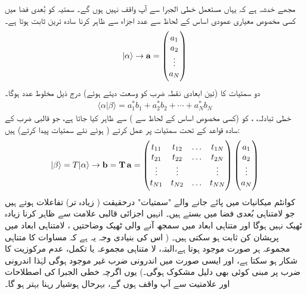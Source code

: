  مجھے خدشہ ہے کہ یہاں مستعمل خطی الجبرا سے آپ واقف نہیں ہوں گے۔ سمتیہ کو  بُعدی فضا میں کسی مخصوص معیاری عمودی اساس کے لحاظ سے  عدد اجزاء 
 سے ظاہر کرنا سادہ ترین ثابت ہوتا ہے۔
	\begin{align}
		|\alpha \rangle \rightarrow \operatorname{\mathbf{a}} = \begin{pmatrix} 
			a_{1}\\
			a_{2}\\
			\vdots\\
			a_{N}
		 \end{pmatrix}
	\end{align}
 دو سمتیات کا 
  (تین ابعادی نقطہ ضرب کو وسعت دیتے ہوئے) درج ذیل مخلوط عدد ہوگا۔
\begin{align}\label{مساوات_قواعد_اندرونی_ضرب}
	\langle \alpha | \beta\rangle =a_1^{\ast}b_1 + a_2^{\ast}b_2 + \dotsb +a_N^{\ast}b_N
\end{align}
خطی تبادلہ، ، کو (کسی مخصوص اساس کے لحاظ سے )  سے ظاہر کیا جاتا ہے، جو قالبی ضرب کے سادہ قواعد کے تحت سمتیات پر عمل کرتے ( ہوئے نئے سمتیات پیدا کرتے) ہیں:
\begin{align}
	|\beta\rangle = T|\alpha \rangle \rightarrow \operatorname{\mathbf{b}} = \operatorname{\mathbf{T}}\operatorname{\mathbf{a}} = \begin{pmatrix}
		t_{11} & t_{12} & \hdots & t_{1N} \\ 
		t_{21} & t_{22} & \hdots & t_{2N} \\
		\vdots & \vdots & & \vdots \\
		t_{N1} & t_{N2} & \hdots & t_{NN} 
	\end{pmatrix}
\begin{pmatrix}
	a_{1}\\
	a_{2}\\
	\vdots\\
	a_{N}
\end{pmatrix}
\end{align}
کوانٹم میکانیات میں پائے جانے والے "سمتیات" درحقیقت ( زیادہ تر) تفاعلات ہوتے ہیں جو لامتناہی بُعدی فضا میں بستے ہیں۔ انہیں  اجزائی قالبی علامت سے ظاہر کرنا زیادہ ٹھیک نہیں ہوگا اور متناہی ابعاد  میں  سمجھ آنے والی ٹھیک وضاحتیں ، لامتناہی ابعاد  میں پریشان کن ثابت ہو سکتی  ہیں۔ ( اس کی بنیادی وجہ یہ ہے کہ  مساوات  کا متناہی مجموعہ ہر صورت موجود ہوتا ہے،البتہ،  لا متناہی مجموعہ یا تکمل،  عدم مرکوزیت کا شکار ہو سکتا ہے، اور ایسی صورت میں اندرونی ضرب غیر موجود ہوگی لہٰذا اندرونی ضرب پر مبنی کوئی بھی دلیل مشکوک ہوگی۔) یوں اگرچہ خطی الجبرا کی اصطلاحات اور علامتیت سے آپ واقف ہوں گے، بہرحال ہوشیار رہنا بہتر ہو گا۔

